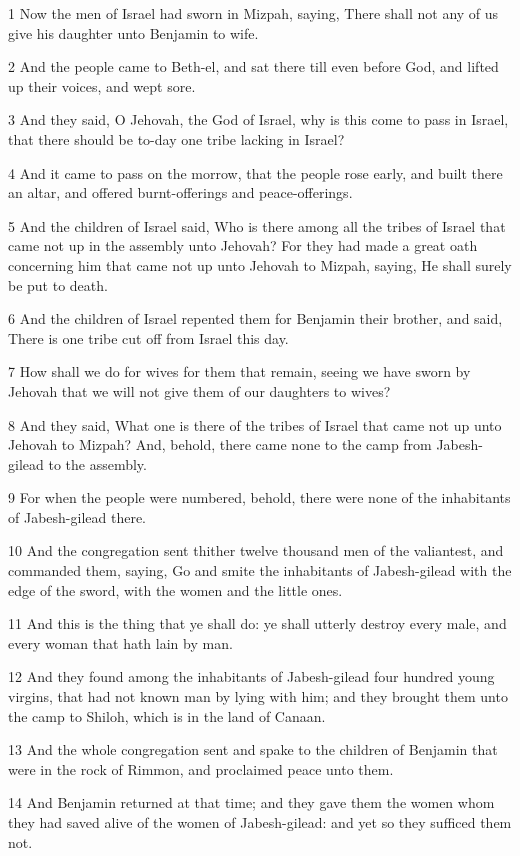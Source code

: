 \par 1 Now the men of Israel had sworn in Mizpah, saying, There shall not any of us give his daughter unto Benjamin to wife.
\par 2 And the people came to Beth-el, and sat there till even before God, and lifted up their voices, and wept sore.
\par 3 And they said, O Jehovah, the God of Israel, why is this come to pass in Israel, that there should be to-day one tribe lacking in Israel?
\par 4 And it came to pass on the morrow, that the people rose early, and built there an altar, and offered burnt-offerings and peace-offerings.
\par 5 And the children of Israel said, Who is there among all the tribes of Israel that came not up in the assembly unto Jehovah? For they had made a great oath concerning him that came not up unto Jehovah to Mizpah, saying, He shall surely be put to death.
\par 6 And the children of Israel repented them for Benjamin their brother, and said, There is one tribe cut off from Israel this day.
\par 7 How shall we do for wives for them that remain, seeing we have sworn by Jehovah that we will not give them of our daughters to wives?
\par 8 And they said, What one is there of the tribes of Israel that came not up unto Jehovah to Mizpah? And, behold, there came none to the camp from Jabesh-gilead to the assembly.
\par 9 For when the people were numbered, behold, there were none of the inhabitants of Jabesh-gilead there.
\par 10 And the congregation sent thither twelve thousand men of the valiantest, and commanded them, saying, Go and smite the inhabitants of Jabesh-gilead with the edge of the sword, with the women and the little ones.
\par 11 And this is the thing that ye shall do: ye shall utterly destroy every male, and every woman that hath lain by man.
\par 12 And they found among the inhabitants of Jabesh-gilead four hundred young virgins, that had not known man by lying with him; and they brought them unto the camp to Shiloh, which is in the land of Canaan.
\par 13 And the whole congregation sent and spake to the children of Benjamin that were in the rock of Rimmon, and proclaimed peace unto them.
\par 14 And Benjamin returned at that time; and they gave them the women whom they had saved alive of the women of Jabesh-gilead: and yet so they sufficed them not.
